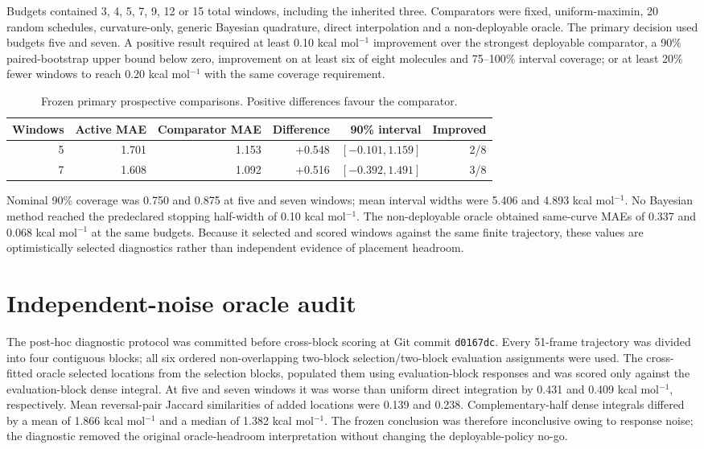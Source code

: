 \documentclass[11pt]{article}
\begin{document}
Budgets contained 3, 4, 5, 7, 9, 12 or 15 total windows, including the inherited three. Comparators were fixed, uniform-maximin, 20 random schedules, curvature-only, generic Bayesian quadrature, direct interpolation and a non-deployable oracle. The primary decision used budgets five and seven. A positive result required at least 0.10 kcal mol$^{-1}$ improvement over the strongest deployable comparator, a 90\% paired-bootstrap upper bound below zero, improvement on at least six of eight molecules and 75--100\% interval coverage; or at least 20\% fewer windows to reach 0.20 kcal mol$^{-1}$ with the same coverage requirement.

\begin{table}[ht]
\centering
\caption{Frozen primary prospective comparisons. Positive differences favour the comparator.}
\begin{tabular}{rrrrrr}
\toprule
Windows & Active MAE & Comparator MAE & Difference & 90\% interval & Improved \\
\midrule
5 & 1.701 & 1.153 & +0.548 & $[-0.101,1.159]$ & 2/8 \\
7 & 1.608 & 1.092 & +0.516 & $[-0.392,1.491]$ & 3/8 \\
\bottomrule
\end{tabular}
\end{table}

Nominal 90\% coverage was 0.750 and 0.875 at five and seven windows; mean interval widths were 5.406 and 4.893 kcal mol$^{-1}$. No Bayesian method reached the predeclared stopping half-width of 0.10 kcal mol$^{-1}$. The non-deployable oracle obtained same-curve MAEs of 0.337 and 0.068 kcal mol$^{-1}$ at the same budgets. Because it selected and scored windows against the same finite trajectory, these values are optimistically selected diagnostics rather than independent evidence of placement headroom.

\section{Independent-noise oracle audit}
The post-hoc diagnostic protocol was committed before cross-block scoring at Git commit \texttt{d0167dc}. Every 51-frame trajectory was divided into four contiguous blocks; all six ordered non-overlapping two-block selection/two-block evaluation assignments were used. The cross-fitted oracle selected locations from the selection blocks, populated them using evaluation-block responses and was scored only against the evaluation-block dense integral. At five and seven windows it was worse than uniform direct integration by 0.431 and 0.409 kcal mol$^{-1}$, respectively. Mean reversal-pair Jaccard similarities of added locations were 0.139 and 0.238. Complementary-half dense integrals differed by a mean of 1.866 kcal mol$^{-1}$ and a median of 1.382 kcal mol$^{-1}$. The frozen conclusion was therefore inconclusive owing to response noise; the diagnostic removed the original oracle-headroom interpretation without changing the deployable-policy no-go.
\end{document}

